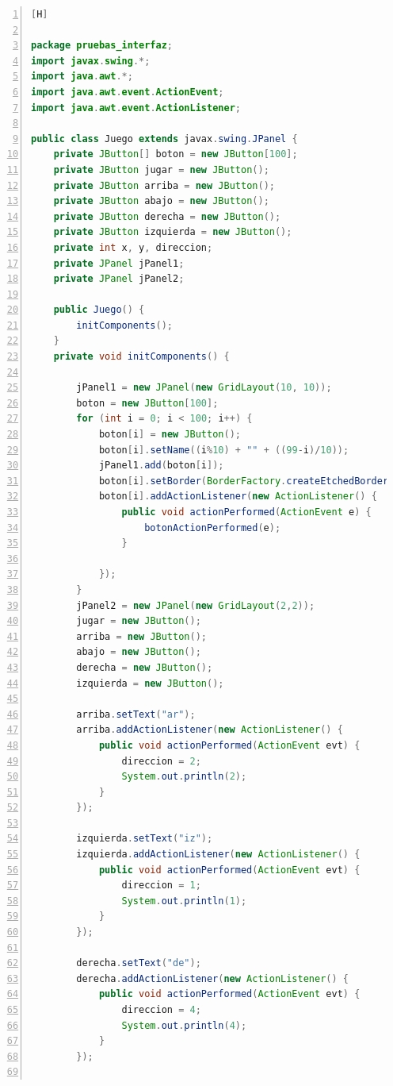 \documentclass{article}
\begin{document}
	\begin{lstlisting}[language=Java,caption={Creando la interfaz de tablero},numbers=left,][H]

package pruebas_interfaz;
import javax.swing.*;
import java.awt.*;
import java.awt.event.ActionEvent;
import java.awt.event.ActionListener;

public class Juego extends javax.swing.JPanel {
    private JButton[] boton = new JButton[100];
    private JButton jugar = new JButton();
    private JButton arriba = new JButton();
    private JButton abajo = new JButton();
    private JButton derecha = new JButton();
    private JButton izquierda = new JButton();
    private int x, y, direccion;
    private JPanel jPanel1;
    private JPanel jPanel2;

    public Juego() {
        initComponents();
    }
    private void initComponents() {

        jPanel1 = new JPanel(new GridLayout(10, 10));
        boton = new JButton[100];
        for (int i = 0; i < 100; i++) {
            boton[i] = new JButton();
            boton[i].setName((i%10) + "" + ((99-i)/10));
            jPanel1.add(boton[i]);
            boton[i].setBorder(BorderFactory.createEtchedBorder());
            boton[i].addActionListener(new ActionListener() {
                public void actionPerformed(ActionEvent e) {
                    botonActionPerformed(e);
                }

            });
        }
        jPanel2 = new JPanel(new GridLayout(2,2));
        jugar = new JButton();
        arriba = new JButton();
        abajo = new JButton();
        derecha = new JButton();
        izquierda = new JButton();

        arriba.setText("ar");
        arriba.addActionListener(new ActionListener() {
            public void actionPerformed(ActionEvent evt) {
                direccion = 2;
                System.out.println(2);
            }
        });

        izquierda.setText("iz");
        izquierda.addActionListener(new ActionListener() {
            public void actionPerformed(ActionEvent evt) {
                direccion = 1;
                System.out.println(1);
            }
        });

        derecha.setText("de");
        derecha.addActionListener(new ActionListener() {
            public void actionPerformed(ActionEvent evt) {
                direccion = 4;
                System.out.println(4);
            }
        });


\end{lstlisting}
\end{document}
